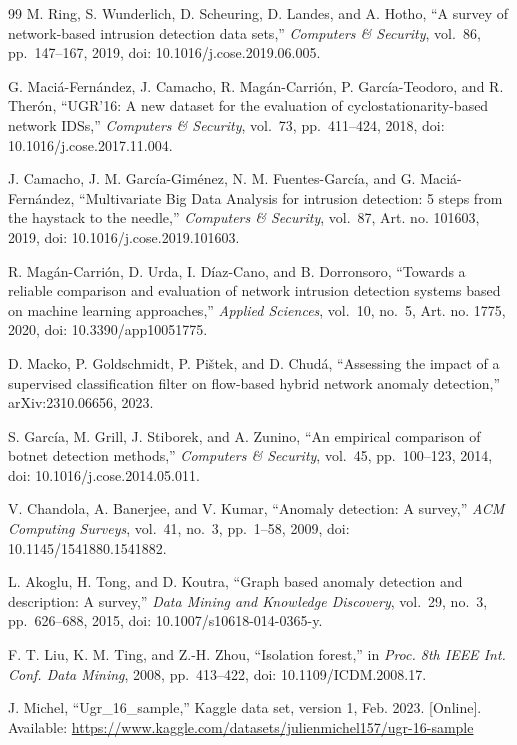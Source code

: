 \documentclass[conference]{IEEEtran}
\begin{document}
\begin{thebibliography}{99}
 M. Ring, S. Wunderlich, D. Scheuring, D. Landes, and A. Hotho, ``A survey of network-based intrusion detection data sets,'' \emph{Computers \& Security}, vol.~86, pp.~147--167, 2019, doi: 10.1016/j.cose.2019.06.005.

 G. Maci\'a-Fern\'andez, J. Camacho, R. Mag\'an-Carri\'on, P. Garc\'ia-Teodoro, and R. Ther\'on, ``UGR'16: A new dataset for the evaluation of cyclostationarity-based network IDSs,'' \emph{Computers \& Security}, vol.~73, pp.~411--424, 2018, doi: 10.1016/j.cose.2017.11.004.

 J. Camacho, J. M. Garc\'ia-Gim\'enez, N. M. Fuentes-Garc\'ia, and G. Maci\'a-Fern\'andez, ``Multivariate Big Data Analysis for intrusion detection: 5 steps from the haystack to the needle,'' \emph{Computers \& Security}, vol.~87, Art. no. 101603, 2019, doi: 10.1016/j.cose.2019.101603.

 R. Mag\'an-Carri\'on, D. Urda, I. D\'iaz-Cano, and B. Dorronsoro, ``Towards a reliable comparison and evaluation of network intrusion detection systems based on machine learning approaches,'' \emph{Applied Sciences}, vol.~10, no.~5, Art. no. 1775, 2020, doi: 10.3390/app10051775.

 D. Macko, P. Goldschmidt, P. Pi\v{s}tek, and D. Chud\'a, ``Assessing the impact of a supervised classification filter on flow-based hybrid network anomaly detection,'' arXiv:2310.06656, 2023.

 S. Garc\'ia, M. Grill, J. Stiborek, and A. Zunino, ``An empirical comparison of botnet detection methods,'' \emph{Computers \& Security}, vol.~45, pp.~100--123, 2014, doi: 10.1016/j.cose.2014.05.011.

 V. Chandola, A. Banerjee, and V. Kumar, ``Anomaly detection: A survey,'' \emph{ACM Computing Surveys}, vol.~41, no.~3, pp.~1--58, 2009, doi: 10.1145/1541880.1541882.

 L. Akoglu, H. Tong, and D. Koutra, ``Graph based anomaly detection and description: A survey,'' \emph{Data Mining and Knowledge Discovery}, vol.~29, no.~3, pp.~626--688, 2015, doi: 10.1007/s10618-014-0365-y.

 F. T. Liu, K. M. Ting, and Z.-H. Zhou, ``Isolation forest,'' in \emph{Proc. 8th IEEE Int. Conf. Data Mining}, 2008, pp.~413--422, doi: 10.1109/ICDM.2008.17.

 J. Michel, ``Ugr\_16\_sample,'' Kaggle data set, version 1, Feb. 2023. [Online]. Available: \url{https://www.kaggle.com/datasets/julienmichel157/ugr-16-sample}


\end{thebibliography}
\end{document}
